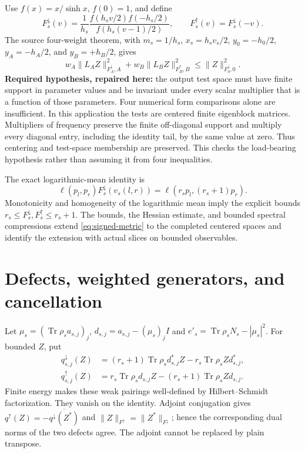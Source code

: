 \documentclass[11pt]{article}
\newcommand{\Tr}{\operatorname{Tr}}
\theoremstyle{remark}\newtheorem{remark}[theorem]{Remark}
\begin{document}
Use $f(x)=x/\sinh x$, $f(0)=1$, and define
\[
 F_s^\downarrow(v)=\frac1{h_s}
 \frac{f(h_sv/2)f(-h_s/2)}{f(h_s(v-1)/2)},\qquad
 F_s^\uparrow(v)=F_s^\downarrow(-v).
\]
The source four-weight theorem, with $m_s=1/h_s$, $x_s=h_sv_s/2$,
$y_0=-h_0/2$, $y_A=-h_A/2$, and $y_B=+h_B/2$, gives
\begin{equation}\label{eq:signed-metric}
 w_A\|L_AZ\|_{F_A^\downarrow,A}^2+
 w_B\|L_BZ\|_{F_B^\uparrow,B}^2
 \le\|Z\|_{F_0^\downarrow,0}^2.
\end{equation}
\textbf{Required hypothesis, repaired here:} the output test space must
have finite support in parameter values and be invariant under every
scalar multiplier that is a function of those parameters. Four numerical
form comparisons alone are insufficient. In this application the tests
are centered finite eigenblock matrices. Multipliers of frequency
preserve the finite off-diagonal support and multiply every diagonal
entry, including the identity tail, by the same value at zero. Thus
centering and test-space membership are preserved. This checks the
load-bearing hypothesis rather than assuming it from four inequalities.

The exact logarithmic-mean identity is
\[
 \ell(p_l,p_r)F_s^\downarrow(v_s(l,r))
 =\ell(r_sp_l,(r_s+1)p_r).
\]
Monotonicity and homogeneity of the logarithmic mean imply the explicit
bounds $r_s\le F_s^\downarrow,F_s^\uparrow\le r_s+1$.
The bounds, the Hessian estimate, and bounded spectral compressions extend
\eqref{eq:signed-metric} to the completed centered spaces and identify
the extension with actual slices on bounded observables.

\section{Defects, weighted generators, and cancellation}
Let $\mu_s=(\Tr\rho_s a_{s,j})_j$, $d_{s,j}=a_{s,j}-(\mu_s)_jI$ and
$e'_s=\Tr\rho_sN_s-|\mu_s|^2$. For bounded $Z$, put
\begin{align*}
 q_{s,j}^\downarrow(Z)&=(r_s+1)\Tr\rho_s d_{s,j}^*Z-r_s\Tr\rho_s Z d_{s,j}^*,\\
 q_{s,j}^\uparrow(Z)&=r_s\Tr\rho_s d_{s,j}Z-(r_s+1)\Tr\rho_s Z d_{s,j}.
\end{align*}
Finite energy makes these weak pairings well-defined by Hilbert--Schmidt
factorization. They vanish on the identity. Adjoint conjugation gives
$q^\uparrow(Z)=-\overline{q^\downarrow(Z^*)}$ and
$\|Z\|_{F^\uparrow}=\|Z^*\|_{F^\downarrow}$; hence the corresponding
dual norms of the two defects agree. The adjoint cannot be replaced by
plain transpose.
\end{document}
